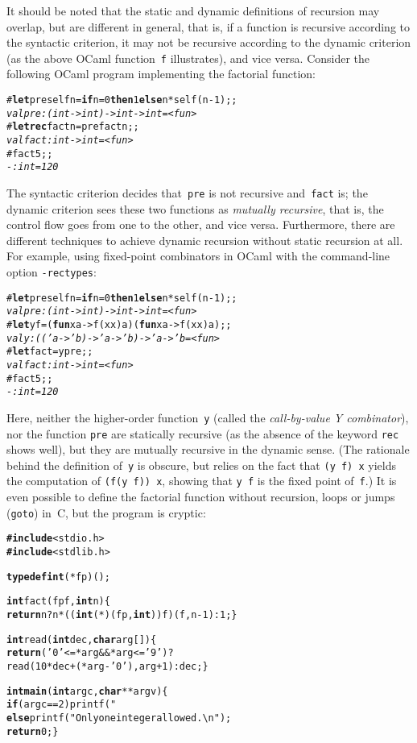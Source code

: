 \documentclass[11pt,a4paper]{article}
\newcommand\plang[1]{\textsf{#1}\xspace}
\newcommand\exc[1]{\texttt{\small #1}}
\begin{document}
It should be noted that the static and dynamic definitions of
recursion may overlap, but are different in general, that is, if a
function is recursive according to the syntactic criterion, it may not
be recursive according to the dynamic criterion (as the above
\plang{OCaml} function~\exc{f} illustrates), and vice versa. Consider
the following \plang{OCaml} program implementing the factorial
function:
{\small
\begin{alltt}
# \textbf{let} pre self n = \textbf{if} n = 0 \textbf{then} 1 \textbf{else} n * self(n-1);;
\emph{val pre : (int -> int) -> int -> int = <fun>}
# \textbf{let rec} fact n = pre fact n;;
\emph{val fact : int -> int = <fun>}
# fact 5;;
\emph{- : int = 120}
\end{alltt}
}
\noindent The syntactic criterion decides that~\exc{pre} is not
recursive and~\exc{fact} is; the dynamic criterion sees these two
functions as \emph{mutually recursive}, that is, the control flow goes
from one to the other, and vice versa. Furthermore, there are
different techniques to achieve dynamic recursion without static
recursion at all. For example, using fixed\hyp{}point combinators in
\plang{OCaml} with the command\hyp{}line option \exc{-rectypes}:
{\small
\begin{alltt}
# \textbf{let} pre self n = \textbf{if} n = 0 \textbf{then} 1 \textbf{else} n * self(n-1);;
\emph{val pre : (int -> int) -> int -> int = <fun>}
# \textbf{let} y f = (\textbf{fun} x a -> f (x x) a) (\textbf{fun} x a -> f (x x) a);;
\emph{val y : (('a -> 'b) -> 'a -> 'b) -> 'a -> 'b = <fun>}
# \textbf{let} fact = y pre;;
\emph{val fact : int -> int = <fun>}
# fact 5;;
\emph{- : int = 120}
\end{alltt}
}
\noindent Here, neither the higher\hyp{}order function~\exc{y} (called
the \emph{call\hyp{}by\hyp{}value Y combinator}), nor the function
\exc{pre} are statically recursive (as the absence of the keyword
\exc{rec} shows well), but they are mutually recursive in the dynamic
sense. (The rationale behind the definition of~\exc{y} is obscure, but
relies on the fact that \exc{(y f) x} yields the computation of
\exc{(f(y f)) x}, showing that \exc{y f} is the fixed point
of~\exc{f}.) It is even possible to define the factorial function
without recursion, loops or jumps (\exc{goto}) in~\plang{C}, but the
program is cryptic: {\small
\begin{alltt}
\textbf{#include}<stdio.h>
\textbf{#include}<stdlib.h>

\textbf{typedef int} (*fp)();

\textbf{int} fact(fp f, \textbf{int} n) \{
  \textbf{return} n? n * ((\textbf{int} (*)(fp,\textbf{int}))f)(f,n-1) : 1; \}

\textbf{int} read(\textbf{int} dec, \textbf{char} arg[]) \{
  \textbf{return} ('0' <= *arg && *arg <= '9')? 
         read(10*dec+(*arg - '0'),arg+1) : dec; \}

\textbf{int main}(\textbf{int} argc, \textbf{char}** argv) \{
  \textbf{if} (argc == 2) printf("%u\textbackslash{n}",fact(&fact,read(0,argv[1])));
  \textbf{else} printf("Only one integer allowed.\textbackslash{n}");
  \textbf{return} 0; \}
\end{alltt}}
\end{document}
